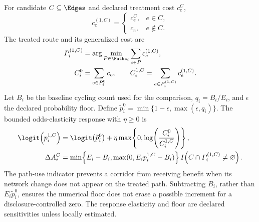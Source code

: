 For candidate $C\subseteq\Edges$ and declared treatment cost $c_e^{C}$,
\begin{equation}
c_e^{(1,C)}=
\begin{cases}
c_e^{C}, & e\in C,\\
c_e, & e\notin C.
\end{cases}
\label{eq:treated-cost}
\end{equation}
The treated route and its generalized cost are
\begin{align}
P_i^{(1,C)}
 &=\arg\min_{P\in\Paths_i}\sum_{e\in P}c_e^{(1,C)},
\label{eq:treated-path}\\
C_i^{0}
 &=\sum_{e\in P_i^{0}}c_e,
\qquad
C_i^{1,C}=\sum_{e\in P_i^{(1,C)}}c_e^{(1,C)}.
\label{eq:path-costs}
\end{align}
Let $B_i$ be the baseline cycling count used for the comparison,
$q_i=B_i/E_i$, and $\epsilon$ the declared probability floor. Define
$\widetilde p_i^0=\min\{1-\epsilon,\max(\epsilon,q_i)\}$. The bounded
odds-elasticity response with $\eta\ge0$ is
\begin{align}
\logit\!\left(p_i^{1,C}\right)
 &= \logit\!\left(\widetilde p_i^{0}\right)
 + \eta\max\!\left\{0,\log\!\left(\frac{C_i^{0}}{C_i^{1,C}}\right)\right\},
\label{eq:odds-elasticity}\\
\Delta A_i^C
 &= \min\!\left\{E_i-B_i,\max(0,E_ip_i^{1,C}-B_i)\right\}
 I\!\left(C\cap P_i^{(1,C)}\ne\varnothing\right).
\label{eq:incremental-trips}
\end{align}
The path-use indicator prevents a corridor from receiving benefit when its
network change does not appear on the treated path. Subtracting $B_i$, rather
than $E_i\widetilde p_i^0$, ensures the numerical floor does not erase a
possible increment for a disclosure-controlled zero. The response elasticity
and floor are declared sensitivities unless locally estimated.
